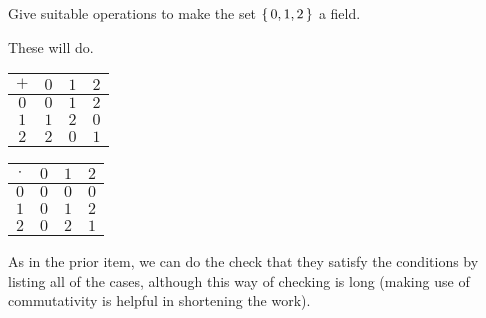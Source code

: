 \begin{exercises}
  \item 
     Give suitable operations to make the set $\mbox{$\{\,0,1,2\,\}$}$
     a field.     
     \begin{answer}
       These will do.
       \begin{center}
          \begin{tabular}{c|ccc}
             \( + \) &\( 0 \) &\( 1 \) &$2$ \\
             \hline
             \( 0 \) &\( 0 \) &\( 1 \) &$2$ \\
             \( 1 \) &\( 1 \) &\( 2 \) &$0$ \\
             $2$     &$2$     &$0$     &$1$
          \end{tabular}
          \qquad
          \begin{tabular}{c|ccc}
            \( \cdot \) &\( 0 \) &\( 1 \) &$2$ \\
            \hline
            \( 0 \)  &\( 0 \) &\( 0 \) &$0$ \\
            \( 1 \)  &\( 0 \) &\( 1 \) &$2$ \\
            $2$      &$0$     &$2$     &$1$
          \end{tabular}
       \end{center}
       As in the prior item, we can do the 
       check that they satisfy the conditions  
       by listing all of the cases, although this way of checking is
       long (making use of commutativity is helpful in 
       shortening the work).
     \end{answer}
\end{exercises}
%
%
